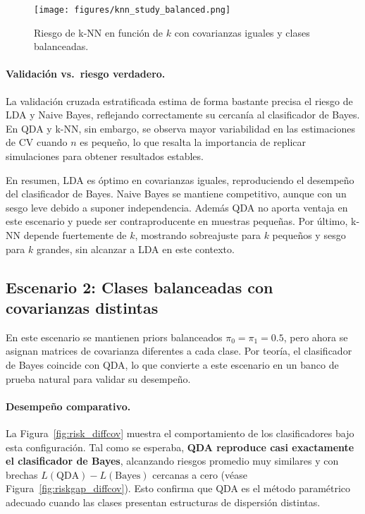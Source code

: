\documentclass[10pt]{article}
\begin{document}
\begin{figure}[H]
    \centering
    \texttt{[image: figures/knn\_study\_balanced.png]}
    \caption{Riesgo de k-NN en función de $k$ con covarianzas iguales y clases balanceadas.}
    \label{fig:knn_samecov}
\end{figure}

\paragraph{Validación vs.\ riesgo verdadero.}
La validación cruzada estratificada estima de forma bastante precisa el riesgo de LDA y Naive Bayes, 
reflejando correctamente su cercanía al clasificador de Bayes. 
En QDA y k-NN, sin embargo, se observa mayor variabilidad en las estimaciones de CV cuando $n$ es pequeño, 
lo que resalta la importancia de replicar simulaciones para obtener resultados estables.

En resumen, LDA es óptimo en covarianzas iguales, reproduciendo el desempeño del clasificador de Bayes. Naive Bayes se mantiene competitivo, aunque con un sesgo leve debido a suponer independencia. Además QDA no aporta ventaja en este escenario y puede ser contraproducente en muestras pequeñas. Por último, k-NN depende fuertemente de $k$, mostrando sobreajuste para $k$ pequeños y sesgo para $k$ grandes, sin alcanzar a LDA en este contexto.

\subsection*{Escenario 2: Clases balanceadas con covarianzas distintas}

En este escenario se mantienen priors balanceados $\pi_0=\pi_1=0.5$, pero ahora se asignan matrices de covarianza diferentes a cada clase. 
Por teoría, el clasificador de Bayes coincide con QDA, lo que convierte a este escenario en un banco de prueba natural para validar su desempeño.

\paragraph{Desempeño comparativo.}
La Figura~\ref{fig:risk_diffcov} muestra el comportamiento de los clasificadores bajo esta configuración. 
Tal como se esperaba, \textbf{QDA reproduce casi exactamente el clasificador de Bayes}, alcanzando riesgos promedio muy similares y con brechas $L(\text{QDA})-L(\text{Bayes})$ cercanas a cero (véase Figura~\ref{fig:riskgap_diffcov}). 
Esto confirma que QDA es el método paramétrico adecuado cuando las clases presentan estructuras de dispersión distintas.
\end{document}
